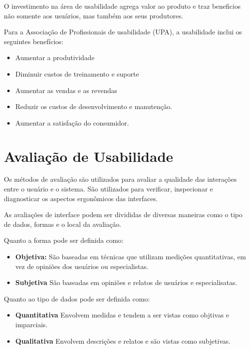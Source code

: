 	O investimento na área de usabilidade agrega valor ao produto e traz beneficios não somente aos usuários, mas também aos seus produtores. 

	Para a Associação de Profissionais de usabilidade (UPA), a usabilidade inclui os seguintes benefícios:

\begin{itemize}
\item Aumentar a produtividade
\item Diminuir custos de treinamento e suporte
\item Aumentar as vendas e as revendas
\item Reduzir os custos de desenvolvimento e manutenção.
\item Aumentar a satisfação do consumidor.
\end{itemize}



\section {Avaliação de Usabilidade}

	
	Os métodos de avaliação são utilizados para avaliar a qualidade das interações entre o usuário e o sistema. São utilizados para verificar, inspecionar e diagnosticar os aspectos ergonômicos das interfaces.

	As avaliações de interface podem ser divididas de diversas maneiras como o tipo de dados, formas e o local da avaliação.

	Quanto a forma pode ser definida como:

	\begin{itemize}
		\item \textbf{Objetiva:} São baseadas em técnicas que utilizam medições quantitativas, em vez de opiniões dos usuários ou especialistas.
		\item \textbf{Subjetiva} São baseadas em opiniões e relatos de usuários e especialisatas.
	\end{itemize}

	Quanto ao tipo de dados pode ser definida como:

	\begin{itemize}
		\item \textbf{Quantitativa} Envolvem medidas e tendem a ser vistas como objtivas e imparciais.
		\item \textbf{Qualitativa} Envolvem descrições e relatos e são vistas como subjetivas.
	\end{itemize}

